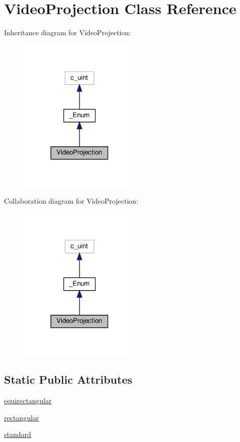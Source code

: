 \hypertarget{classvlc_1_1_video_projection}{}\section{Video\+Projection Class Reference}
\label{classvlc_1_1_video_projection}


Inheritance diagram for Video\+Projection\+:
\nopagebreak
\begin{figure}[H]
\begin{center}
\leavevmode
\includegraphics[width=165pt]{classvlc_1_1_video_projection__inherit__graph}
\end{center}
\end{figure}


Collaboration diagram for Video\+Projection\+:
\nopagebreak
\begin{figure}[H]
\begin{center}
\leavevmode
\includegraphics[width=165pt]{classvlc_1_1_video_projection__coll__graph}
\end{center}
\end{figure}
\subsection*{Static Public Attributes}
\begin{DoxyCompactItemize}
\item 
\hyperlink{classvlc_1_1_video_projection_a33f4cbad6b42440285a2bfdf79d597a7}{equirectangular}
\item 
\hyperlink{classvlc_1_1_video_projection_a6f97a7a4261ded2a82decc49dde3b048}{rectangular}
\item 
\hyperlink{classvlc_1_1_video_projection_a528ee3c70bd5eab258de3ef941fb1d05}{standard}
\end{DoxyCompactItemize}
